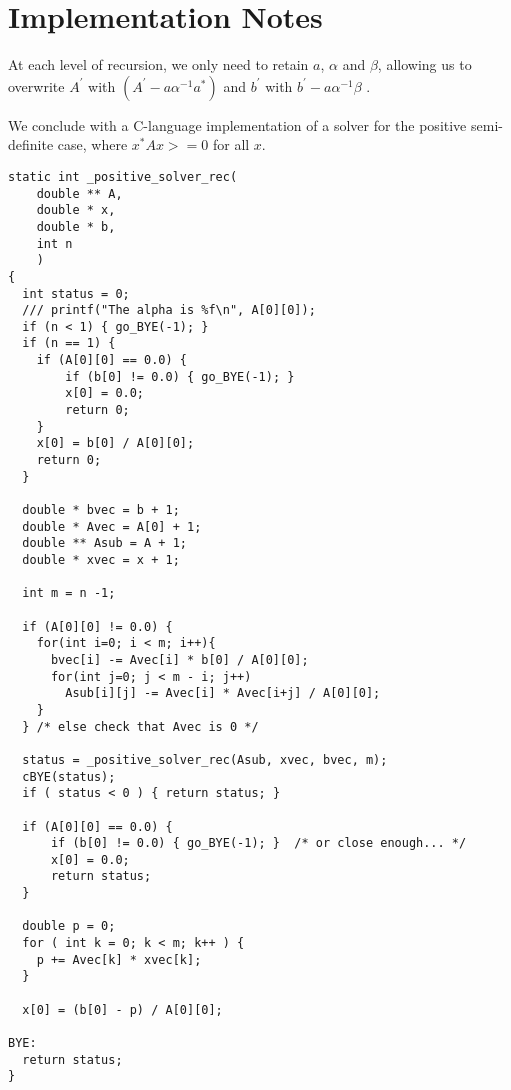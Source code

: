 \documentclass{article}
\begin{document}
\section{Implementation Notes}
At each level of recursion, we only need to retain
$a$,
$\alpha$
and
$\beta$, allowing us to overwrite
$A^{'}$
with $(A^{'} - a\alpha^{-1}a^*)$
and
$b^{'}$ with
$b^{'}-a\alpha^{-1}\beta$
.

We conclude with a C-language implementation of a solver for the positive semi-definite case, where
$x^*Ax >=0 $ for all $x$.

\begin{verbatim}
static int _positive_solver_rec(
    double ** A,
    double * x,
    double * b,
    int n
    )
{
  int status = 0;
  /// printf("The alpha is %f\n", A[0][0]);
  if (n < 1) { go_BYE(-1); }
  if (n == 1) {
    if (A[0][0] == 0.0) {
        if (b[0] != 0.0) { go_BYE(-1); }
        x[0] = 0.0;
        return 0;
    }
    x[0] = b[0] / A[0][0];
    return 0;
  }

  double * bvec = b + 1;
  double * Avec = A[0] + 1;
  double ** Asub = A + 1;
  double * xvec = x + 1;

  int m = n -1;

  if (A[0][0] != 0.0) {
    for(int i=0; i < m; i++){
      bvec[i] -= Avec[i] * b[0] / A[0][0];
      for(int j=0; j < m - i; j++)
        Asub[i][j] -= Avec[i] * Avec[i+j] / A[0][0];
    }
  } /* else check that Avec is 0 */

  status = _positive_solver_rec(Asub, xvec, bvec, m);
  cBYE(status);
  if ( status < 0 ) { return status; }

  if (A[0][0] == 0.0) {
      if (b[0] != 0.0) { go_BYE(-1); }  /* or close enough... */
      x[0] = 0.0;
      return status;
  }

  double p = 0;
  for ( int k = 0; k < m; k++ ) {
    p += Avec[k] * xvec[k];
  }

  x[0] = (b[0] - p) / A[0][0];

BYE:
  return status;
}
\end{verbatim}
\end{document}
